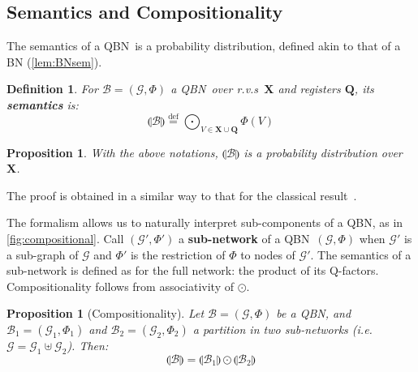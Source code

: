 \documentclass[10pt,a4paper]{article}
\newcommand*{\ie}{\emph{i.e.}\xspace}
\newcommand*{\definitive}[1]{\textbf{#1}}
\newcommand*{\defeq}{\stackrel{\text{def}}{=}}
\newcommand*{\G}{\mathcal{G}}
\newcommand{\sem}[1]{\llparenthesis{#1}\rrparenthesis}
\newcommand*{\compfact}{\odot}
\newcommand{\bX}{\mathbf X}
\newcommand{\bQ}{\mathbf Q}
\newcommand*{\someqfactset}{\Phi}
\newcommand{\rv}{r.v.\xspace}
\newcommand{\rvs}{r.v.s\xspace}
\newcommand*{\qfactor}{Q-factor}
\newcommand*{\qqbn}{\textsf{QBN}}
\newtheorem{proposition}[theorem]{Proposition}
\newtheorem{definition}[theorem]{Definition}
\newtheorem{remark}[theorem]{Remark}
\begin{document}
\subsection{Semantics and Compositionality}

The semantics of a \qqbn\ is a probability distribution, defined akin to that of a BN (\cref{lem:BNsem}).

\begin{definition}
For $\mathcal{B} = (\G,\someqfactset)$ a \qqbn\ over \rvs\ $\bX$ and registers $\bQ$, its \definitive{semantics} is:
\begin{equation*}
\sem{\mathcal{B}} \defeq \bigodot_{V \in \bX\cup\bQ} \someqfactset(V)
\end{equation*}
\end{definition}

\begin{proposition}
\label{lem:sem_qbn_dist}
With the above notations, $\sem{\mathcal{B}}$ is a probability distribution over $\bX$.
\end{proposition}
The proof is obtained in a similar way to that for the classical result~\cite{Pearl86}.

The formalism allows us to naturally interpret sub-components of a \qqbn, as in \cref{fig:compositional}.
Call $(\G',\someqfactset')$ a \definitive{sub-network} of a \qqbn\ $(\G,\someqfactset)$ when $\G'$ is a sub-graph of $\G$ and $\someqfactset'$ is the restriction of $\someqfactset$ to nodes of $\G'$.
The semantics of a sub-network is defined as for the full network: the product of its \qfactor s.
Compositionality follows from associativity of $\compfact$.

\begin{proposition}[Compositionality]
\label{lem:compositionality_qbn}
Let $\mathcal{B} = (\G,\someqfactset)$ be a \qqbn, and $\mathcal{B}_1 = (\G_1,\someqfactset_1)$ and $\mathcal{B}_2 = (\G_2,\someqfactset_2)$ a partition in two sub-networks (\ie\ $\G = \G_1 \uplus \G_2$).
Then:
\begin{equation*}
\sem{\mathcal{B}} = \sem{\mathcal{B}_1} \compfact \sem{\mathcal{B}_2}
\end{equation*}
\end{proposition}

\end{document}
